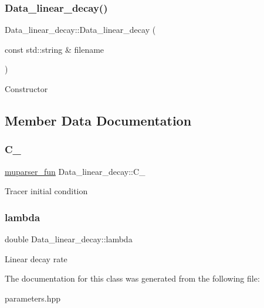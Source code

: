 \subsubsection{\texorpdfstring{Data\+\_\+linear\+\_\+decay()}{Data\_linear\_decay()}}
{\footnotesize\ttfamily Data\+\_\+linear\+\_\+decay\+::\+Data\+\_\+linear\+\_\+decay (\begin{DoxyParamCaption}\item[{const std\+::string \&}]{filename }\end{DoxyParamCaption})\hspace{0.3cm}{\ttfamily [explicit]}}

Constructor 

\subsection{Member Data Documentation}
\mbox{\label{classData__linear__decay_a5d20ff72dec9169f01f0468cd5ce3d1b}} 
\subsubsection{\texorpdfstring{C\+\_}{C\_0}}
{\footnotesize\ttfamily \hyperlink{classmuparser__fun}{muparser\+\_\+fun} Data\+\_\+linear\+\_\+decay\+::\+C\+\_}

Tracer initial condition \mbox{\label{classData__linear__decay_a30addcafe68743155a59fe9f7db4f15b}} 
\subsubsection{\texorpdfstring{lambda}{lambda}}
{\footnotesize\ttfamily double Data\+\_\+linear\+\_\+decay\+::lambda}

Linear decay rate 

The documentation for this class was generated from the following file\+:\begin{DoxyCompactItemize}
\item 
parameters.\+hpp\end{DoxyCompactItemize}
